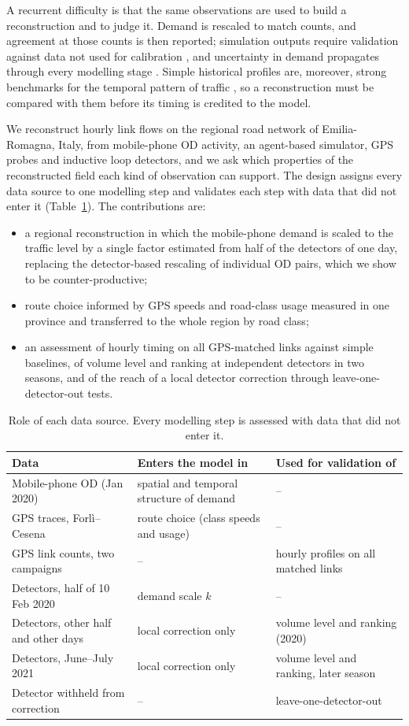 \documentclass[pdflatex,Numbered]{sn-jnl}
\begin{document}
A recurrent difficulty is that the same observations are used to build a reconstruction and to judge it. Demand is rescaled to match counts, and agreement at those counts is then reported; simulation outputs require validation against data not used for calibration \cite{toledo2004,hollander2008}, and uncertainty in demand propagates through every modelling stage \cite{zhao2002,rasouli2012}. Simple historical profiles are, moreover, strong benchmarks for the temporal pattern of traffic \cite{lippi2013,vlahogianni2014}, so a reconstruction must be compared with them before its timing is credited to the model.

We reconstruct hourly link flows on the regional road network of Emilia-Romagna, Italy, from mobile-phone OD activity, an agent-based simulator, GPS probes and inductive loop detectors, and we ask which properties of the reconstructed field each kind of observation can support. The design assigns every data source to one modelling step and validates each step with data that did not enter it (Table~\ref{tab:roles}). The contributions are:
\begin{itemize}
\item a regional reconstruction in which the mobile-phone demand is scaled to the traffic level by a single factor estimated from half of the detectors of one day, replacing the detector-based rescaling of individual OD pairs, which we show to be counter-productive;
\item route choice informed by GPS speeds and road-class usage measured in one province and transferred to the whole region by road class;
\item an assessment of hourly timing on all GPS-matched links against simple baselines, of volume level and ranking at independent detectors in two seasons, and of the reach of a local detector correction through leave-one-detector-out tests.
\end{itemize}

\begin{table}[htbp]
\centering
\caption{Role of each data source. Every modelling step is assessed with data that did not enter it.}
\label{tab:roles}
\begin{tabular}{@{}p{3.6cm}p{5.4cm}p{6.0cm}@{}}
\toprule
Data & Enters the model in & Used for validation of \\
\midrule
Mobile-phone OD (Jan 2020) & spatial and temporal structure of demand & -- \\
GPS traces, Forl\`i--Cesena & route choice (class speeds and usage) & -- \\
GPS link counts, two campaigns & -- & hourly profiles on all matched links \\
Detectors, half of 10 Feb 2020 & demand scale $k$ & -- \\
Detectors, other half and other days & local correction only & volume level and ranking (2020) \\
Detectors, June--July 2021 & local correction only & volume level and ranking, later season \\
Detector withheld from correction & -- & leave-one-detector-out \\
\bottomrule
\end{tabular}
\end{table}
\end{document}

